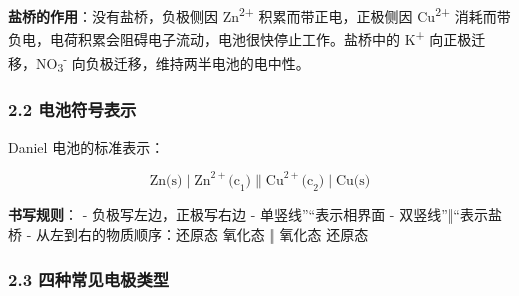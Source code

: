 \documentclass[a4paper,11pt]{ctexart}
\begin{document}
\textbf{盐桥的作用}：没有盐桥，负极侧因 Zn\textsuperscript{2+} 积累而带正电，正极侧因 Cu\textsuperscript{2+} 消耗而带负电，电荷积累会阻碍电子流动，电池很快停止工作。盐桥中的 K\textsuperscript{+} 向正极迁移，NO\textsubscript{3}\textsuperscript{-} 向负极迁移，维持两半电池的电中性。

\subsubsection{2.2 电池符号表示}\label{ux7535ux6c60ux7b26ux53f7ux8868ux793a}

Daniel 电池的标准表示：

\[
\text{Zn(s)} \mid \text{Zn}^{2+}\text{(c}_1\text{)} \| \text{Cu}^{2+}\text{(c}_2\text{)} \mid \text{Cu(s)}
\]

\textbf{书写规则}：
- 负极写左边，正极写右边
- 单竖线''\textbar{}``表示相界面
- 双竖线''‖``表示盐桥
- 从左到右的物质顺序：还原态 \textbar{} 氧化态 ‖ 氧化态 \textbar{} 还原态

\subsubsection{2.3 四种常见电极类型}\label{ux56dbux79cdux5e38ux89c1ux7535ux6781ux7c7bux578b}
\end{document}
